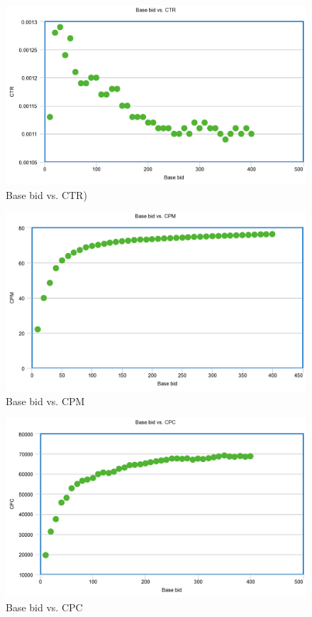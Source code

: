 \documentclass{sig-alternate-05-2015}
\begin{document}
\begin{figure}
  \includegraphics[width=\linewidth]{linear_CTR.png}
  \caption{Base bid vs. CTR)}
  \label{fig:bids}
\end{figure}

\begin{figure}
  \includegraphics[width=\linewidth]{linear_CPM.png}
  \caption{Base bid vs. CPM}
  \label{fig:bids}
\end{figure}

\begin{figure}
  \includegraphics[width=\linewidth]{linear_CPC.png}
  \caption{Base bid vs. CPC}
  \label{fig:bids}
\end{figure}
\end{document}
